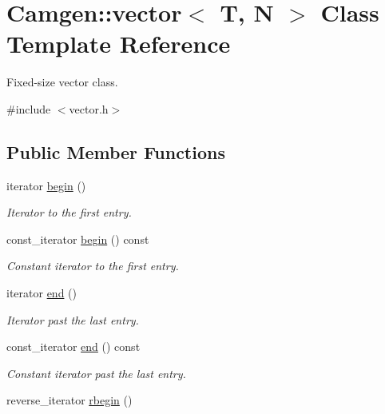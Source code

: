 \hypertarget{a00579}{}\section{Camgen\+:\+:vector$<$ T, N $>$ Class Template Reference}
\label{a00579}


Fixed-\/size vector class.  




{\ttfamily \#include $<$vector.\+h$>$}

\subsection*{Public Member Functions}
\begin{DoxyCompactItemize}
\item 
\hypertarget{a00579_a9f8c68bcf6968d27858dc0d77084085d}{}iterator \hyperlink{a00579_a9f8c68bcf6968d27858dc0d77084085d}{begin} ()\label{a00579_a9f8c68bcf6968d27858dc0d77084085d}

\begin{DoxyCompactList}\small\item\em Iterator to the first entry. \end{DoxyCompactList}\item 
\hypertarget{a00579_a82a835a5610044d013b21394104a4039}{}const\+\_\+iterator \hyperlink{a00579_a82a835a5610044d013b21394104a4039}{begin} () const \label{a00579_a82a835a5610044d013b21394104a4039}

\begin{DoxyCompactList}\small\item\em Constant iterator to the first entry. \end{DoxyCompactList}\item 
\hypertarget{a00579_ae7a9267eaa5dfda5a687363d3b16572e}{}iterator \hyperlink{a00579_ae7a9267eaa5dfda5a687363d3b16572e}{end} ()\label{a00579_ae7a9267eaa5dfda5a687363d3b16572e}

\begin{DoxyCompactList}\small\item\em Iterator past the last entry. \end{DoxyCompactList}\item 
\hypertarget{a00579_aec7b8f730795653968b675230072edf2}{}const\+\_\+iterator \hyperlink{a00579_aec7b8f730795653968b675230072edf2}{end} () const \label{a00579_aec7b8f730795653968b675230072edf2}

\begin{DoxyCompactList}\small\item\em Constant iterator past the last entry. \end{DoxyCompactList}\item 
\hypertarget{a00579_ab2fbf02683447ce7cf3c940fa07407fc}{}reverse\+\_\+iterator \hyperlink{a00579_ab2fbf02683447ce7cf3c940fa07407fc}{rbegin} ()\label{a00579_ab2fbf02683447ce7cf3c940fa07407fc}


\end{DoxyCompactItemize}
